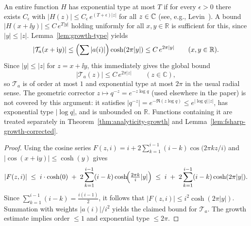 \begin{remark}
An entire function $H$ has exponential type at most $T$ if for every $\epsilon>0$ there exists $C_\epsilon$ with $|H(z)|\le C_\epsilon\,e^{(T+\epsilon)|z|}$ for all $z\in\mathbb{C}$ (see, e.g., Levin~\cite{levin1996}). A bound $|H(x+\ii y)|\le C\,e^{T|y|}$ holding uniformly for all $x,y\in\mathbb R$ is sufficient for this, since $|y|\le|z|$. Lemma~\ref{lem:growth-type} yields 
\[
|\mathcal T_a(x+\mathrm{i} y)|\le \Bigl(\sum |a(i)|\Bigr)\cosh(2\pi|y|)\le C\,e^{2\pi|y|}
\qquad(x,y\in\mathbb R).
\]
Since $|y|\le |z|$ for $z=x+\ii y$, this immediately gives the global bound
\[
|\mathcal T_a(z)|\le C\,e^{2\pi|z|}\qquad(z\in\mathbb C),
\]
so $\mathcal T_a$ is of order at most $1$ and exponential type at most $2\pi$ in the usual radial sense. The geometric corrector $z\mapsto q^{-z}=e^{-z\log q}$ (used elsewhere in the paper) is not covered by this argument: it satisfies $|q^{-z}|=e^{-\Re(z\log q)}\le e^{|\log q|\,|z|}$, has exponential type $|\log q|$, and is unbounded on $\mathbb R$. Functions containing it are treated separately in Theorem~\ref{thm:analyticity-growth} and Lemma~\ref{lem:fsharp-growth-corrected}.
\end{remark}

\begin{proof}
Using the cosine series $F(z,i)= i+2\sum_{k=1}^{i-1}(i-k)\cos\!\bigl(2\pi k z/i\bigr)$ and $|\cos(x+\mathrm{i}y)|\le\cosh(y)$ gives
\[
|F(z,i)|\;\le\; i\cdot\cosh(0)\;+\;2\sum_{k=1}^{i-1}(i-k)\cosh\!\Bigl(\tfrac{2\pi k}{i}|y|\Bigr)
\;\le\; i\;+\;2\sum_{k=1}^{i-1}(i-k)\cosh(2\pi|y|).
\]
Since $\sum_{k=1}^{i-1}(i-k)=\tfrac{i(i-1)}{2}$, it follows that $|F(z,i)|\le i^2\cosh(2\pi|y|)$. Summation with weights $|a(i)|/i^2$ yields the claimed bound for $\mathcal{T}_a$. The growth estimate implies order $\le 1$ and exponential type $\le 2\pi$.
\end{proof}

